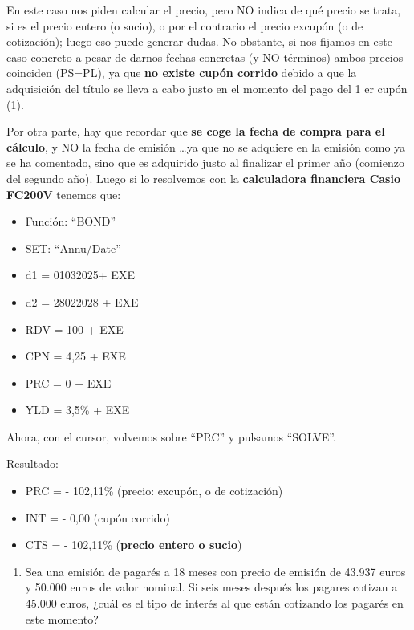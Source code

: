 \documentclass[
  letterpaper,
  DIV=11,
  numbers=noendperiod]{scrreprt}
\providecommand{\tightlist}{%
  \setlength{\itemsep}{0pt}\setlength{\parskip}{0pt}}\usepackage{longtable,booktabs,array}
\begin{document}
\begin{tcolorbox}
\begin{tcolorbox}[enhanced jigsaw, toprule=.15mm, left=2mm, arc=.35mm, breakable, bottomrule=.15mm, opacityback=0, rightrule=.15mm, leftrule=.75mm, colframe=quarto-callout-note-color-frame, colback=white]
\begin{minipage}[t]{\textwidth - 5.5mm}
En este caso nos piden calcular el precio, pero NO indica de qué precio
se trata, si es el precio entero (o sucio), o por el contrario el precio
excupón (o de cotización); luego eso puede generar dudas. No obstante,
si nos fijamos en este caso concreto a pesar de darnos fechas concretas
(y NO términos) ambos precios coinciden (PS=PL), ya que \textbf{no
existe cupón corrido} debido a que la adquisición del título se lleva a
cabo justo en el momento del pago del 1 er cupón (1).

Por otra parte, hay que recordar que \textbf{se coge la fecha de compra
para el cálculo}, y NO la fecha de emisión \ldots ya que no se adquiere
en la emisión como ya se ha comentado, sino que es adquirido justo al
finalizar el primer año (comienzo del segundo año). Luego si lo
resolvemos con la \textbf{calculadora financiera Casio FC200V} tenemos
que:

\begin{itemize}
\item
  Función: ``BOND''
\item
  SET: ``Annu/Date''
\item
  d1 = 01032025+ EXE
\item
  d2 = 28022028 + EXE
\item
  RDV = 100 + EXE
\item
  CPN = 4,25 + EXE
\item
  PRC = 0 + EXE
\item
  YLD = 3,5\% + EXE
\end{itemize}

Ahora, con el cursor, volvemos sobre ``PRC'' y pulsamos ``SOLVE''.

Resultado:

\begin{itemize}
\item
  PRC = - 102,11\% (precio: excupón, o de cotización)
\item
  INT = - 0,00 (cupón corrido)
\item
  CTS = - 102,11\% (\textbf{precio entero o sucio})
\end{itemize}

\end{minipage}%
\end{tcolorbox}

\begin{enumerate}
\def\labelenumi{\arabic{enumi}.}
\setcounter{enumi}{3}
\tightlist
\item
  Sea una emisión de pagarés a 18 meses con precio de emisión de 43.937
  euros y 50.000 euros de valor nominal. Si seis meses después los
  pagares cotizan a 45.000 euros, ¿cuál es el tipo de interés al que
  están cotizando los pagarés en este momento?
\end{enumerate}


\end{tcolorbox}
\end{document}

